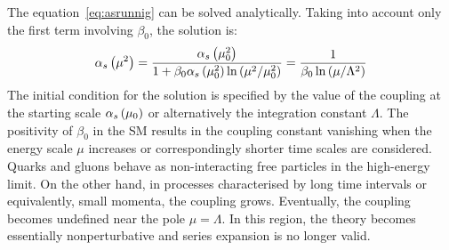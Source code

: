 The equation~\eqref{eq:asrunnig} can be solved analytically. Taking into account only the first term involving $\beta_0$, the solution is:
\begin{equation}
 \mbox{$\alpha_{s}$}\left(\mu^2\right) = \dfrac{ \mbox{$\alpha_{s}$}\left(\mu_0^2\right) }{1+\beta_0\mbox{$\alpha_{s}$}\left(\mu_0^2\right)\ln{\left(\mu^2/\mu_0^2\right)}} = \dfrac{1}{\beta_0\ln{\left(\mu/\Lambda^2\right)}}
\label{eq:asrunnigsolution}
\end{equation}
The initial condition for the solution is specified by the value of the coupling at the starting scale $\mbox{$\alpha_{s}$}\left(\mu_0\right)$ or alternatively the integration constant $\Lambda$. The positivity of $\beta_0$ in the SM results in the coupling constant vanishing when the energy scale $\mu$ increases or correspondingly shorter time scales are considered. Quarks and gluons behave as non-interacting free particles in the high-energy limit. On the other hand, in processes characterised by long time intervals or equivalently, small momenta, the coupling grows. Eventually, the coupling becomes undefined near the pole $\mu = \Lambda$. In this region, the theory becomes essentially nonperturbative and series expansion is no longer valid. 


